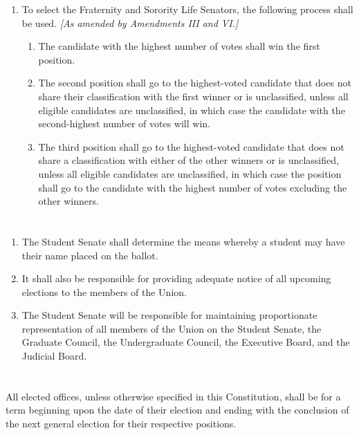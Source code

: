 \documentclass{uniondoc}
\begin{document}
\begin{enumerate}
\item To select the Fraternity and Sorority Life Senators, the following process shall be used. \textit{[As amended by Amendments III and VI.]}
  \begin{enumerate}
  \item The candidate with the highest number of votes shall win the first position.
  \item The second position shall go to the highest-voted candidate that does not share their classification with the first winner or is unclassified, unless all eligible candidates are unclassified, in which case the candidate with the second-highest number of votes will win.
  \item The third position shall go to the highest-voted candidate that does not share a classification with either of the other winners or is unclassified, unless all eligible candidates are unclassified, in which case the position shall go to the candidate with the highest number of votes excluding the other winners.
  \end{enumerate}
\end{enumerate}

\section{}

\begin{enumerate}
\item The Student Senate shall determine the means whereby a student may have their name placed on the ballot.
\item It shall also be responsible for providing adequate notice of all upcoming elections to the members of the Union.
\item The Student Senate will be responsible for maintaining proportionate representation of all members of the Union on the Student Senate, the Graduate Council, the Undergraduate Council, the Executive Board, and the Judicial Board.
\end{enumerate}

\section{}

All elected offices, unless otherwise specified in this Constitution, shall be for a term beginning upon the date of their election and ending with the conclusion of the next general election for their respective positions.
\end{document}
